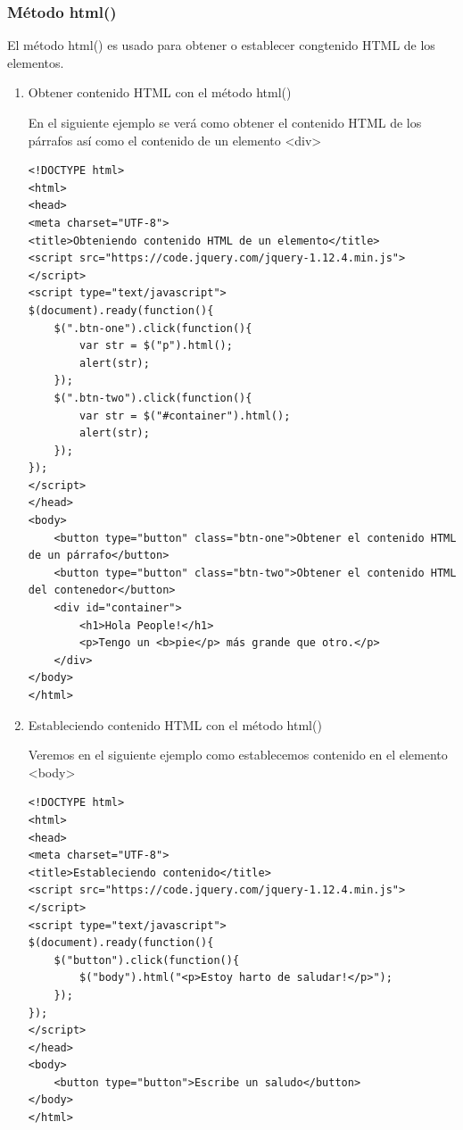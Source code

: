 \documentclass[a4paper, oneside]{article}
\begin{document}
\subsubsection{Método html()}
\label{sec:org036052c}

El método html() es usado para obtener o establecer congtenido HTML de los elementos.

\begin{enumerate}
\item Obtener contenido HTML con el método html()
\label{sec:orgcfde57f}

En el siguiente ejemplo se verá como obtener el contenido HTML de los párrafos así como el contenido de un elemento <div>

\begin{verbatim}
<!DOCTYPE html>
<html>
<head>
<meta charset="UTF-8">
<title>Obteniendo contenido HTML de un elemento</title>
<script src="https://code.jquery.com/jquery-1.12.4.min.js"></script>
<script type="text/javascript">
$(document).ready(function(){
    $(".btn-one").click(function(){
        var str = $("p").html();
        alert(str);
    });
    $(".btn-two").click(function(){
        var str = $("#container").html();
        alert(str);
    });
});
</script>
</head>
<body>
    <button type="button" class="btn-one">Obtener el contenido HTML de un párrafo</button>
    <button type="button" class="btn-two">Obtener el contenido HTML del contenedor</button>
    <div id="container">
        <h1>Hola People!</h1>
        <p>Tengo un <b>pie</p> más grande que otro.</p>
    </div>
</body>
</html>                                		
\end{verbatim}

\item Estableciendo contenido HTML con el método html()
\label{sec:orgfea8117}

Veremos en el siguiente ejemplo como establecemos contenido en el elemento <body>

\begin{verbatim}
<!DOCTYPE html>
<html>
<head>
<meta charset="UTF-8">
<title>Estableciendo contenido</title>
<script src="https://code.jquery.com/jquery-1.12.4.min.js"></script>
<script type="text/javascript">
$(document).ready(function(){
    $("button").click(function(){
        $("body").html("<p>Estoy harto de saludar!</p>");
    });
});
</script>
</head>
<body>
    <button type="button">Escribe un saludo</button>
</body>
</html>                                		
\end{verbatim}
\end{enumerate}
\end{document}
